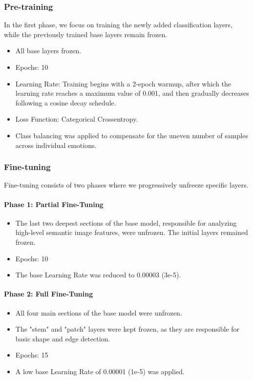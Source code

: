 \documentclass{article}
\begin{document}
\subsubsection{Pre-training}
In the first phase, we focus on training the newly added classification layers, while the previously trained base layers remain frozen.
\begin{itemize}
    \item All base layers frozen.
    \item Epochs: 10
    \item Learning Rate: Training begins with a 2-epoch warmup, after which the learning rate reaches a maximum value of 0.001, and then gradually decreases following a cosine decay schedule.
    \item Loss Function: Categorical Crossentropy.
    \item Class balancing was applied to compensate for the uneven number of samples across individual emotions.
\end{itemize}

\subsubsection{Fine-tuning}
Fine-tuning consists of two phases where we progressively unfreeze specific layers.

\paragraph{Phase 1: Partial Fine-Tuning}
\begin{itemize}
    \item The last two deepest sections of the base model, responsible for analyzing high-level semantic image features, were unfrozen. The initial layers remained frozen.
    \item Epochs: 10
    \item The base Learning Rate was reduced to 0.00003 (3e-5).
\end{itemize}

\paragraph{Phase 2: Full Fine-Tuning}
\begin{itemize}
    \item All four main sections of the base model were unfrozen.
    \item The "stem" and "patch" layers were kept frozen, as they are responsible for basic shape and edge detection.
    \item Epochs: 15
    \item A low base Learning Rate of 0.00001 (1e-5) was applied.
\end{itemize}
\end{document}
